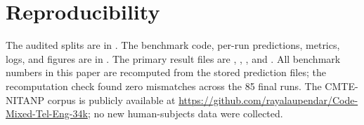 \documentclass[10pt,journal]{IEEEtran}
\begin{document}
\section*{Reproducibility}
The audited splits are in . The benchmark code, per-run predictions, metrics, logs, and figures are in . The primary result files are , , , and . All benchmark numbers in this paper are recomputed from the stored prediction files; the recomputation check found zero mismatches across the 85 final runs. The CMTE-NITANP corpus is publicly available at \url{https://github.com/rayalaupendar/Code-Mixed-Tel-Eng-34k}; no new human-subjects data were collected.
\end{document}
